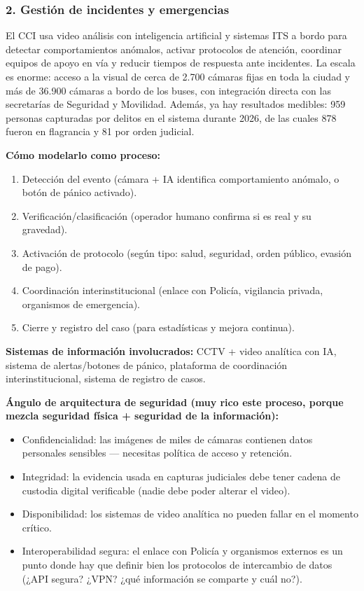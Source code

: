 \subsubsection*{2. Gestión de incidentes y emergencias}

El CCI usa video análisis con inteligencia artificial y sistemas ITS a bordo para detectar comportamientos anómalos, activar protocolos de atención, coordinar equipos de apoyo en vía y reducir tiempos de respuesta ante incidentes. La escala es enorme: acceso a la visual de cerca de 2.700 cámaras fijas en toda la ciudad y más de 36.900 cámaras a bordo de los buses, con integración directa con las secretarías de Seguridad y Movilidad. Además, ya hay resultados medibles: 959 personas capturadas por delitos en el sistema durante 2026, de las cuales 878 fueron en flagrancia y 81 por orden judicial.

\textbf{Cómo modelarlo como proceso:}
\begin{enumerate}
    \item Detección del evento (cámara + IA identifica comportamiento anómalo, o botón de pánico activado).
    \item Verificación/clasificación (operador humano confirma si es real y su gravedad).
    \item Activación de protocolo (según tipo: salud, seguridad, orden público, evasión de pago).
    \item Coordinación interinstitucional (enlace con Policía, vigilancia privada, organismos de emergencia).
    \item Cierre y registro del caso (para estadísticas y mejora continua).
\end{enumerate}

\textbf{Sistemas de información involucrados:} CCTV + video analítica con IA, sistema de alertas/botones de pánico, plataforma de coordinación interinstitucional, sistema de registro de casos.

\textbf{Ángulo de arquitectura de seguridad (muy rico este proceso, porque mezcla seguridad física + seguridad de la información):}
\begin{itemize}
    \item Confidencialidad: las imágenes de miles de cámaras contienen datos personales sensibles — necesitas política de acceso y retención.
    \item Integridad: la evidencia usada en capturas judiciales debe tener cadena de custodia digital verificable (nadie debe poder alterar el video).
    \item Disponibilidad: los sistemas de video analítica no pueden fallar en el momento crítico.
    \item Interoperabilidad segura: el enlace con Policía y organismos externos es un punto donde hay que definir bien los protocolos de intercambio de datos (¿API segura? ¿VPN? ¿qué información se comparte y cuál no?).
\end{itemize}
